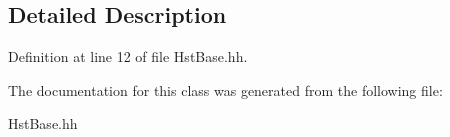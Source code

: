 \subsection{Detailed Description}


Definition at line 12 of file Hst\-Base.\-hh.



The documentation for this class was generated from the following file\-:\begin{DoxyCompactItemize}
\item 
Hst\-Base.\-hh\end{DoxyCompactItemize}
